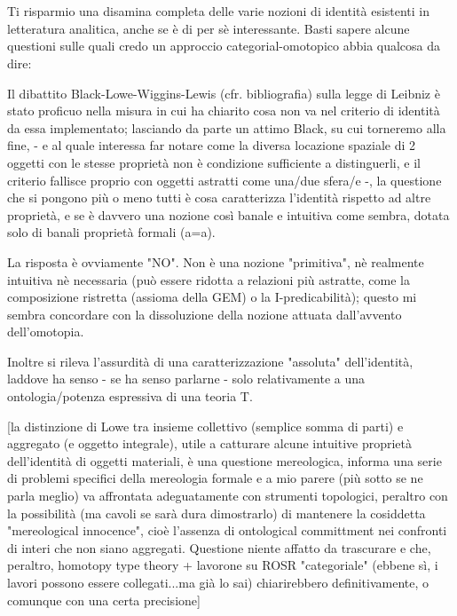 \documentclass{amsart}
\begin{document}
\section{} 
Ti risparmio una disamina completa delle varie nozioni di identità esistenti in letteratura analitica, anche se è di per sè interessante. Basti sapere alcune questioni sulle quali credo un approccio categorial-omotopico abbia qualcosa da dire: 

Il dibattito Black-Lowe-Wiggins-Lewis (cfr. bibliografia) sulla legge di Leibniz è stato proficuo nella misura in cui ha chiarito cosa non va nel criterio di identità da essa implementato; lasciando da parte un attimo Black, su cui torneremo alla fine, - e al quale interessa far notare come la diversa locazione spaziale di 2 oggetti con le stesse proprietà non è condizione sufficiente a distinguerli, e il criterio fallisce proprio con oggetti astratti come una/due sfera/e -, la questione che si pongono più o meno tutti è cosa caratterizza l'identità rispetto ad altre proprietà, e se è davvero una nozione così banale e intuitiva come sembra, dotata solo di banali proprietà formali (a=a). 

La risposta è ovviamente "NO". Non è una nozione "primitiva", nè realmente intuitiva nè necessaria (può essere ridotta a relazioni più astratte, come la composizione ristretta (assioma della GEM) o la I-predicabilità); questo mi sembra concordare con la dissoluzione della nozione attuata dall'avvento dell'omotopia.

Inoltre si rileva l'assurdità di una caratterizzazione "assoluta" dell'identità, laddove ha senso - se ha senso parlarne - solo relativamente a una ontologia/potenza espressiva di una teoria T. 

[la distinzione di Lowe tra insieme collettivo (semplice somma di parti) e aggregato (e oggetto integrale), utile a catturare alcune intuitive proprietà dell'identità di oggetti materiali, è una questione mereologica, informa una serie di problemi specifici della mereologia formale e a mio parere (più sotto se ne parla meglio) va affrontata adeguatamente con strumenti topologici, peraltro con la possibilità (ma cavoli se sarà dura dimostrarlo) di mantenere la cosiddetta "mereological innocence", cioè l'assenza di ontological committment nei confronti di interi che non siano aggregati. Questione niente affatto da trascurare e che, peraltro, homotopy type theory + lavorone su ROSR "categoriale" (ebbene sì, i lavori possono essere collegati...ma già lo sai) chiarirebbero definitivamente, o comunque con una certa precisione]
\end{document}
